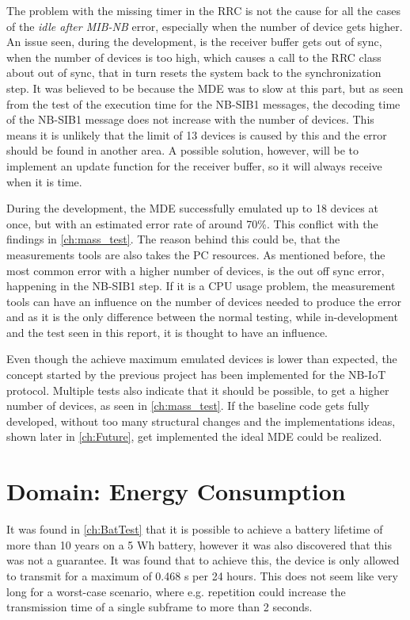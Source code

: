 The problem with the missing timer in the RRC is not the cause for all the cases of the \textit{idle after MIB-NB} error, especially when the number of device gets higher. An issue seen, during the development, is the receiver buffer gets out of sync, when the number of devices is too high, which causes a call to the RRC class about out of sync, that in turn resets the system back to the synchronization step. It was believed to be because the MDE was to slow at this part, but as seen from the test of the execution time for the NB-SIB1 messages, the decoding time of the NB-SIB1 message does not increase with the number of devices. This means it is unlikely that the limit of 13 devices is caused by this and the error should be found in another area. A possible solution, however, will be to implement an update function for the receiver buffer, so it will always receive when it is time.

During the development, the MDE successfully emulated up to 18 devices at once, but with an estimated error rate of around 70\%. This conflict with the findings in \autoref{ch:mass_test}. The reason behind this could be, that the measurements tools are also takes the PC resources. As mentioned before, the most common error with a higher number of devices, is the out off sync error, happening in the NB-SIB1 step. If it is a CPU usage problem, the measurement tools can have an influence on the number of devices needed to produce the error and as it is the only difference between the normal testing, while in-development and the test seen in this report, it is thought to have an influence.

Even though the achieve maximum emulated devices is lower than expected, the concept started by the previous project has been implemented for the NB-IoT protocol. Multiple tests also indicate that it should be possible, to get a higher number of devices, as seen in \autoref{ch:mass_test}. If the baseline code gets fully developed, without too many structural changes and the implementations ideas, shown later in \autoref{ch:Future}, get implemented the ideal MDE could be realized. 



\section{Domain: Energy Consumption}
It was found in \autoref{ch:BatTest} that it is possible to achieve a battery lifetime of more than 10 years on a 5 Wh battery, however it was also discovered that this was not a guarantee. It was found that to achieve this, the device is only allowed to transmit for a maximum of 0.468 s per 24 hours. This does not seem like very long for a worst-case scenario, where e.g. repetition could increase the transmission time of a single subframe to more than 2 seconds. 

